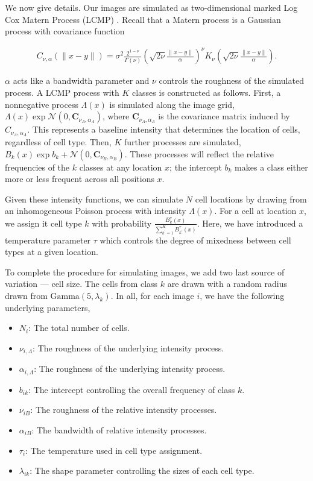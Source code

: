 We now give details. Our images are simulated as two-dimensional marked Log Cox
Matern Process (LCMP) \cite{diggle2013}. Recall that a Matern process is a
Gaussian process with covariance function

\begin{align*}
C_{\nu, \alpha}(\|x - y\|)=\sigma^{2} \frac{2^{1-\nu}}{\Gamma(\nu)}\left(\sqrt{2 \nu} \frac{\|x - y\|}{\alpha}\right)^{\nu} K_{\nu}\left(\sqrt{2 \nu} \frac{\|x - y\|}{\alpha}\right).
\end{align*}

$\alpha$ acts like a bandwidth parameter and $\nu$ controls the roughness of the
simulated process. A LCMP process with $K$ classes is constructed as follows.
First, a nonnegative process $\Lambda\left(x\right)$ is simulated along the
image grid, $\Lambda\left(x\right) \exp{\mathcal{N}\left(0,
  \mathbf{C}_{\nu_{\Lambda}, \alpha_{\Lambda}}\right)}$, where
$\mathbf{C}_{\nu_{\Lambda}, \alpha_{\Lambda}}$ is the covariance matrix induced
by $C_{\nu_{\Lambda}, \alpha_{\Lambda}}$. This represents a baseline intensity
that determines the location of cells, regardless of cell type. Then, $K$
further processes are simulated, $B_{k}\left(x\right) \exp{b_{k} +
  \mathcal{N}\left(0, \mathbf{C}_{\nu_{B}, \alpha_{B}}\right)} $. These
processes will reflect the relative frequencies of the $k$ classes at any
location $x$; the intercept $b_k$ makes a class either more or less frequent
across all positions $x$.

Given these intensity functions, we can simulate $N$ cell locations by drawing
from an inhomogeneous Poisson process with intensity $\Lambda\left(x\right)$.
For a cell at location $x$, we assign it cell type $k$ with probability
$\frac{B_{k}^{\tau}\left(x\right)}{\sum_{k^\prime = 1}^{K}
  B^{\tau}_{k^\prime}\left(x\right)}$. Here, we have introduced a temperature
parameter $\tau$ which controls the degree of mixedness between cell types at a
given location.

To complete the procedure for simulating images, we add two last source of
variation — cell size. The cells from class $k$ are drawn with a random radius
drawn from $\text{Gamma}\left(5, \lambda_{k}\right)$. In all, for each image
$i$, we have the following underlying parameters,

\begin{itemize}
\item $N_i$: The total number of cells.
\item $\nu_{i,\Lambda}$: The roughness of the underlying intensity process.
\item $\alpha_{i,\Lambda}$: The roughness of the underlying intensity process.
\item $b_{ik}$: The intercept controlling the overall frequency of class $k$.
\item $\nu_{iB}$: The roughness of the relative intensity processes.
\item $\alpha_{iB}$: The bandwidth of relative intensity processes.
\item $\tau_{i}$: The temperature used in cell type assignment.
\item $\lambda_{ik}$: The shape parameter controlling the sizes of each cell type.
\end{itemize}

